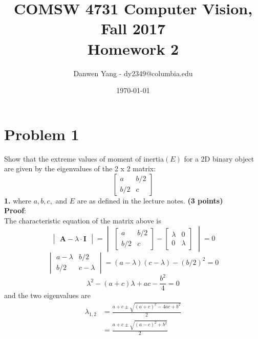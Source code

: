 \documentclass[letterpaper,flegn,12pt]{extarticle}
\begin{document}
\title{COMSW 4731 Computer Vision, Fall 2017
\\Homework 2}
\author{Danwen Yang - dy2349@columbia.edu}
\date{\today}
\maketitle

\section*{Problem 1}
Show that the extreme values of moment of inertia$(E)$ for a 2D binary object are given by the eigenvalues of the 2 x 2 matrix:
\begin{equation}
\nonumber
\begin{bmatrix}
	a & b/2 \\
	b/2 & c
\end{bmatrix}
\end{equation}
\textbf{1.} where $a, b, c,$ and $E$ are as defined in the lecture notes. \textbf{(3 points)}
\\ \textbf{Proof}:
\\ The characteristic equation of the matrix above is
\begin{equation}
\nonumber
\begin{vmatrix}
	\textbf{A} - \lambda \cdot \textbf{I}
\end{vmatrix}
= 
\begin{vmatrix}
	\begin{bmatrix}
		a & b/2 \\
		b/2 & c
	\end{bmatrix}
	-
	\begin{bmatrix}
		\lambda & 0 \\
		0 & \lambda
	\end{bmatrix}
\end{vmatrix}
= 0
\end{equation}
\begin{equation}
\nonumber
	\begin{vmatrix}
		a-\lambda & b/2 \\
		b/2 & c-\lambda
	\end{vmatrix}
	= (a-\lambda)(c-\lambda)-(b/2)^2 = 0
\end{equation}
\begin{equation}
\nonumber \lambda^2 -(a+c)\lambda+ac-\frac{b^2}{4} = 0
\end{equation}
and the two eigenvalues are 
\begin{equation}
\nonumber
\begin{aligned}
	\lambda_{1,2} &= \frac{a+c \pm \sqrt{(a+c)^2-4ac+b^2}}{2} \\
	&= \frac{a+c \pm \sqrt{(a-c)^2+b^2}}{2}
\end{aligned}
\end{equation}
\end{document}
